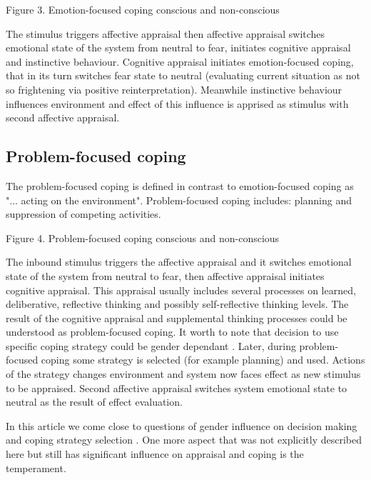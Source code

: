 \begin{center}
Figure 3. Emotion-focused coping conscious and non-conscious
\end{center}

The stimulus triggers affective appraisal then affective appraisal switches emotional state of the system from neutral to fear, initiates cognitive appraisal and instinctive behaviour. Cognitive appraisal initiates emotion-focused coping, that in its turn switches fear state to neutral (evaluating current situation as not so frightening via positive reinterpretation). Meanwhile instinctive behaviour influences environment and effect of this influence is apprised as stimulus with second affective appraisal.

\subsection{Problem-focused coping}

The problem-focused coping is defined in contrast to emotion-focused coping as "... acting on the environment". Problem-focused coping includes: planning and suppression of competing activities.

\begin{center}
Figure 4. Problem-focused coping conscious and non-conscious
\end{center}

The inbound stimulus triggers the affective appraisal and it switches emotional state of the system from neutral to fear, then affective appraisal initiates cognitive appraisal. This appraisal usually includes several processes on learned, deliberative, reflective thinking and possibly self-reflective thinking levels. The result of the cognitive appraisal and supplemental thinking processes could be understood as problem-focused coping. It worth to note that decision to use specific coping strategy could be gender dependant \cite{sex_differencies}. Later, during problem-focused coping some strategy is selected (for example planning) and used. Actions of the strategy changes environment and system now faces effect as new stimulus to be appraised. Second affective appraisal switches system emotional state to neutral as the result of effect evaluation.

In this article we come close to questions of gender influence on decision making and coping strategy selection \cite{sex_differencies}. One more aspect that was not explicitly described here but still has significant influence on appraisal and coping is the temperament.

